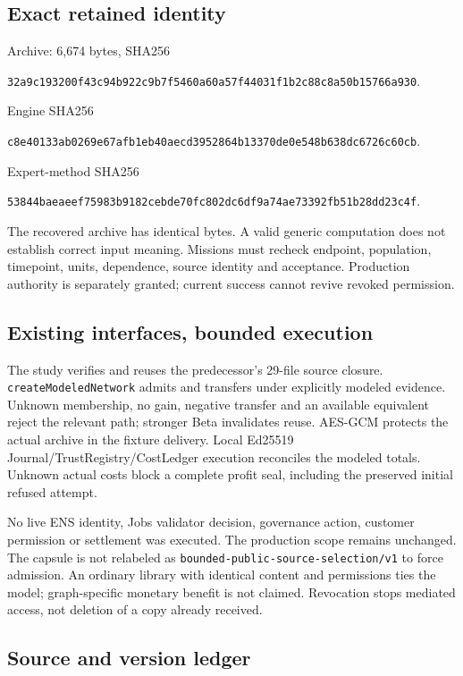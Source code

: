 \documentclass[10pt]{article}
\begin{document}
\subsection*{Exact retained identity}

\small
Archive: 6,674 bytes, SHA256\par
\nolinkurl{32a9c193200f43c94b922c9b7f5460a60a57f44031f1b2c88c8a50b15766a930}.

Engine SHA256\par
\nolinkurl{c8e40133ab0269e67afb1eb40aecd3952864b13370de0e548b638dc6726c60cb}.

Expert-method SHA256\par
\nolinkurl{53844baeaeef75983b9182cebde70fc802dc6df9a74ae73392fb51b28dd23c4f}.
\normalsize

The recovered archive has identical bytes. A valid generic computation does not establish correct input meaning. Missions must recheck endpoint, population, timepoint, units, dependence, source identity and acceptance. Production authority is separately granted; current success cannot revive revoked permission.

\subsection*{Existing interfaces, bounded execution}

The study verifies and reuses the predecessor's 29-file source closure. \texttt{createModeledNetwork} admits and transfers under explicitly modeled evidence. Unknown membership, no gain, negative transfer and an available equivalent reject the relevant path; stronger Beta invalidates reuse. AES-GCM protects the actual archive in the fixture delivery. Local Ed25519 Journal/TrustRegistry/CostLedger execution reconciles the modeled totals. Unknown actual costs block a complete profit seal, including the preserved initial refused attempt.

No live ENS identity, Jobs validator decision, governance action, customer permission or settlement was executed. The production scope remains unchanged. The capsule is not relabeled as \texttt{bounded-public-source-selection/v1} to force admission. An ordinary library with identical content and permissions ties the model; graph-specific monetary benefit is not claimed. Revocation stops mediated access, not deletion of a copy already received.

\subsection*{Source and version ledger}
\end{document}
